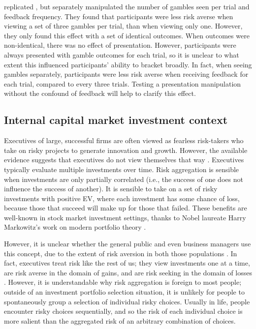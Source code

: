 \documentclass[a4paper, nobind, dvipsnames]{templates/ociamthesis}
\theoremstyle{definition}
\theoremstyle{definition}
\theoremstyle{definition}
\theoremstyle{definition}
\theoremstyle{remark}
\begin{document}
\textcite{moher2010} replicated \textcite{gneezy1997}, but separately manipulated the number of
gambles seen per trial and feedback frequency. They found that participants were
less risk averse when viewing a set of three gambles per trial, than when
viewing only one. However, they only found this effect with a set of identical
outcomes. When outcomes were non-identical, there was no effect of presentation.
However, participants were always presented with gamble outcomes for each trial,
so it is unclear to what extent this influenced participants' ability to bracket
broadly. In fact, when seeing gambles separately, participants were less risk
averse when receiving feedback for each trial, compared to every three trials.
Testing a presentation manipulation without the confound of feedback will help
to clarify this effect.

\subsection{Internal capital market investment context}

Executives of large, successful firms are often viewed as fearless risk-takers
who take on risky projects to generate innovation and growth. However, the
available evidence suggests that executives do not view themselves that way
\autocite{swalm1966,march1987}. Executives typically evaluate multiple investments
over time. Risk aggregation is sensible when investments are only partially
correlated (i.e., the success of one does not influence the success of another).
It is sensible to take on a set of risky investments with positive EV, where
each investment has some chance of loss, because those that succeed will make up
for those that failed. These benefits are well-known in stock market investment
settings, thanks to Nobel laureate Harry Markowitz's work on modern portfolio
theory \autocite*{markowitz1952}.

However, it is unclear whether the general public and even business managers use
this concept, due to the extent of risk aversion in both those populations
\autocites[e.g.,][]{tversky1992,march1987}. In fact, executives treat risk like the rest
of us; they view investments one at a time, are risk averse in the domain of
gains, and are risk seeking in the domain of losses \autocite{maccrimmon1986,swalm1966,lovallo2020}. However, it is understandable why risk aggregation is
foreign to most people; outside of an investment portfolio selection situation,
it is unlikely for people to spontaneously group a selection of individual risky
choices. Usually in life, people encounter risky choices sequentially, and so
the risk of each individual choice is more salient than the aggregated risk of
an arbitrary combination of choices.
\end{document}
